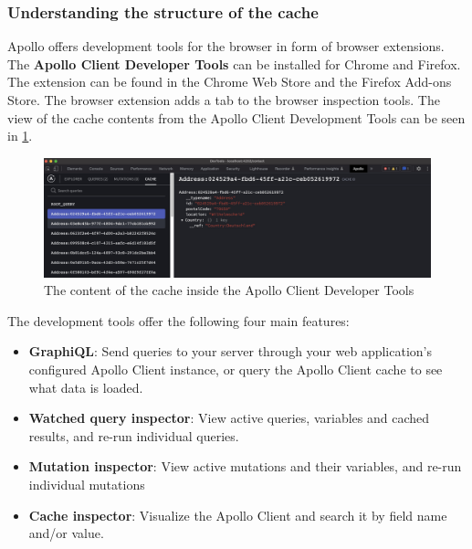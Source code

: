 \subsubsection{Understanding the structure of the cache}

Apollo offers development tools for the browser in form of browser extensions. The \textbf{Apollo Client Developer Tools} can be installed for Chrome and Firefox. The extension can be found in the Chrome Web Store and the Firefox Add-ons Store. The browser extension adds a tab to the browser inspection tools. \cite{misc:-:background:graphql:apollo-developer-tools} The view of the cache contents from the Apollo Client Development Tools can be seen in  \ref{fig:background:graphql:apollo:apollo-dev-tools}.

\ifshowImages
  \begin{figure}[H]
  \centering
  \includegraphics[width=1\linewidth]{images/background/apollo/apollo-dev-tools.jpeg}
  \caption{The content of the cache inside the Apollo Client Developer Tools}\label{fig:background:graphql:apollo:apollo-dev-tools}
  \end{figure}
\fi

The development tools offer the following four main features: \cite{misc:-:background:graphql:apollo-developer-tools}

\begin{itemize}
  \item \textbf{GraphiQL}: Send queries to your server through your web application's configured Apollo Client instance, or query the Apollo Client cache to see what data is loaded.
  \item \textbf{Watched query inspector}: View active queries, variables and cached results, and re-run individual queries.
  \item \textbf{Mutation inspector}: View active mutations and their variables, and re-run individual mutations
  \item \textbf{Cache inspector}: Visualize the Apollo Client and search it by field name and/or value.
\end{itemize}

